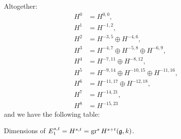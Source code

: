 Altogether:
\begin{align*}
  H^{0} &= H^{0,0}, \\
  H^{1} &= H^{-1,2}, \\
  H^{2} &= H^{-3,5} \oplus H^{-4,6}, \\
  H^{3} &= H^{-4,7} \oplus H^{-5,8} \oplus H^{-6,9}, \\
  H^{4} &= H^{-7,11} \oplus H^{-8,12}, \\
  H^{5} &= H^{-9,14} \oplus H^{-10,15} \oplus H^{-11,16}, \\
  H^{6} &= H^{-11,17} \oplus H^{-12,18}, \\
  H^{7} &= H^{-14,21}, \\
  H^{8} &= H^{-15,23}
\end{align*}
and we have the following table:
\begin{table}[ht]
  \centering
  \caption[Graded cohomology dimensions for $I \subseteq \SL_{3}(\Z_{p})$]{Dimensions of $E_{1}^{s,t} = H^{s,t} = \operatorname{gr}^{s} H^{s+t}(\mathfrak{g},k)$.}
  \label{tab:graded-coh-dims-SL3}
\end{table}
